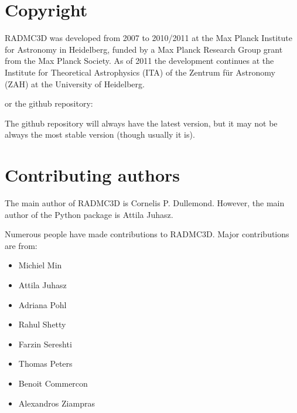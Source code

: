 \documentclass[letterpaper,10pt,english]{sphinxmanual}
\begin{document}
\section{Copyright}
\label{\detokenize{introduction:copyright}}
RADMC\sphinxhyphen{}3D was developed from 2007 to 2010/2011 at the Max Planck Institute
for Astronomy in Heidelberg, funded by a Max Planck Research Group grant
from the Max Planck Society. As of 2011 the development continues at the
Institute for Theoretical Astrophysics (ITA) of the Zentrum für Astronomy
(ZAH) at the University of Heidelberg.



or the github repository:


The github repository will always have the latest version, but it may
not be always the most stable version (though usually it is).


\section{Contributing authors}
\label{\detokenize{introduction:contributing-authors}}
The main author of RADMC\sphinxhyphen{}3D is Cornelis P. Dullemond. However, the main
author of the  Python package is Attila Juhasz.

Numerous people have made contributions to RADMC\sphinxhyphen{}3D. Major contributions
are from:
\begin{itemize}
\item {} 
Michiel Min

\item {} 
Attila Juhasz

\item {} 
Adriana Pohl

\item {} 
Rahul Shetty

\item {} 
Farzin Sereshti

\item {} 
Thomas Peters

\item {} 
Benoit Commercon

\item {} 
Alexandros Ziampras

\end{itemize}
\end{document}

